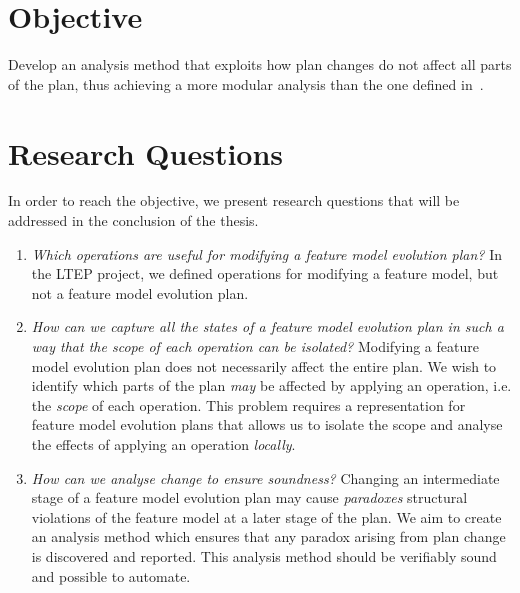 
\section{Objective}
\label{sec:objective}

Develop an analysis method that exploits how plan changes do not affect all parts of the plan, thus achieving a more modular analysis than the one defined in~\cite{art:consistency-preserving-evolution-planning}.

\section{Research Questions}
\label{sec:research-questions}

In order to reach the objective, we present research questions that will be addressed in the conclusion of the thesis.

\begin{enumerate}[\itbf{RQ\arabic*}, itemsep=0mm]
   \item \textit{Which operations are useful for modifying a feature model evolution plan?} In the LTEP project, we defined operations for modifying a feature model, but not a feature model evolution plan. \label{rq1}
   \item \textit{How can we capture all the states of a feature model evolution plan in such a way that the scope of each operation can be isolated?} Modifying a feature model evolution plan does not necessarily affect the entire plan. We wish to identify which parts of the plan \emph{may} be affected by applying an operation, i.e. the \emph{scope} of each operation. This problem requires a representation for feature model evolution plans that allows us to isolate the scope and analyse the effects of applying an operation \emph{locally}. \label{rq2}
   \item \textit{How can we analyse change to ensure soundness?} 
      Changing an intermediate stage of a feature model evolution plan may cause \emph{paradoxes} \textemdash{} structural violations of the feature model \textemdash{} at a later stage of the plan. 
      We aim to create an analysis method which ensures that any paradox arising from plan change is discovered and reported. This analysis method should be verifiably sound and possible to automate. \label{rq3}
\end{enumerate}


